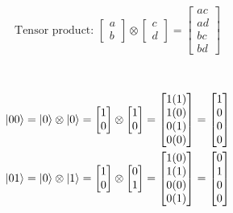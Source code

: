 \documentclass{article}
\begin{document}
\[
    \text{Tensor product: } \begin{bmatrix} a \\ b \end{bmatrix} \otimes \begin{bmatrix} c \\ d \end{bmatrix} = \begin{bmatrix} ac \\ ad \\ bc \\ bd \end{bmatrix}
\] \\\\
\begin{align*}
    \begin{split}
        \ket{00} &= \ket{0} \otimes \ket{0} = \begin{bmatrix} 1 \\ 0 \end{bmatrix} \otimes \begin{bmatrix} 1 \\ 0 \end{bmatrix} = \begin{bmatrix} 1(1) \\ 1(0) \\ 0(1) \\ 0(0) \end{bmatrix} = \begin{bmatrix} 1 \\ 0 \\ 0 \\ 0 \end{bmatrix}\\
        \ket{01} &= \ket{0} \otimes \ket{1} = \begin{bmatrix} 1 \\ 0 \end{bmatrix} \otimes \begin{bmatrix} 0 \\ 1 \end{bmatrix} = \begin{bmatrix} 1(0) \\ 1(1) \\ 0(0) \\ 0(1) \end{bmatrix} = \begin{bmatrix} 0 \\ 1 \\ 0 \\ 0 \end{bmatrix}\\

\end{split}
\end{align*}
\end{document}
